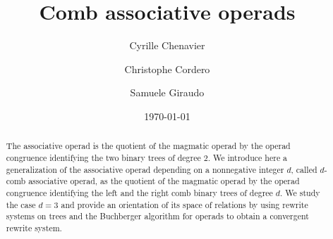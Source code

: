 \documentclass[10pt,reqno]{amsart}
\title{Comb associative operads}
\date{\today}
\author{Cyrille Chenavier \and Christophe Cordero \and Samuele Giraudo}
\numberwithin{equation}{subsection}
\begin{document}
\begin{abstract}
    The associative operad is the quotient of the magmatic operad by
    the operad congruence identifying the two binary trees of degree
    $2$. We introduce here a generalization of the associative operad
    depending on a nonnegative integer $d$, called $d$-comb associative
    operad, as the quotient of the magmatic operad by the operad
    congruence identifying the left and the right comb binary trees of
    degree $d$. We study the case $d = 3$ and provide an orientation
    of its space of relations by using rewrite systems on trees and
    the Buchberger algorithm for operads to obtain a convergent
    rewrite system.
\end{abstract}

\maketitle

\tableofcontents














\end{document}
